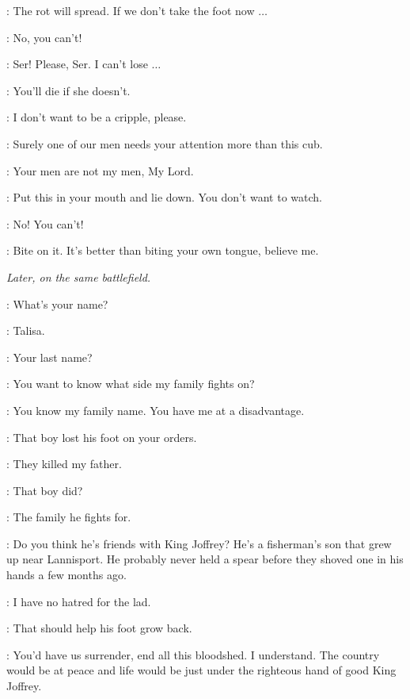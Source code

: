 \TALISA: The rot will spread. If we don't take the foot now $\ldots$  

\WOUNDEDLANNISTER: No, you can't! 


\WOUNDEDLANNISTER: Ser! Please, Ser. I can't lose $\ldots$  

\ROBB: You'll die if she doesn't. 

\WOUNDEDLANNISTER: I don't want to be a cripple, please. 

\ROOSE: Surely one of our men needs your attention more than this cub. 

\TALISA: Your men are not my men, My Lord. 

\ROBB: Put this in your mouth and lie down. You don't want to watch. 

\WOUNDEDLANNISTER: No! You can't! 

\ROBB: Bite on it. It's better than biting your own tongue, believe me. 



\scene

\textit{Later, on the same battlefield.} 


\ROBB: What's your name? 

\TALISA: Talisa. 

\ROBB: Your last name? 

\TALISA: You want to know what side my family fights on? 

\ROBB: You know my family name. You have me at a disadvantage. 

\TALISA: That boy lost his foot on your orders. 

\ROBB: They killed my father. 

\TALISA: That boy did? 

\ROBB: The family he fights for. 

\TALISA: Do you think he's friends with King Joffrey? He's a fisherman's son that grew up near Lannisport. He probably never held a spear before they shoved one in his hands a few months ago. 

\ROBB: I have no hatred for the lad. 

\TALISA: That should help his foot grow back. 

\ROBB: You'd have us surrender, end all this bloodshed. I understand. The country would be at peace and life would be just under the righteous hand of good King Joffrey. 

